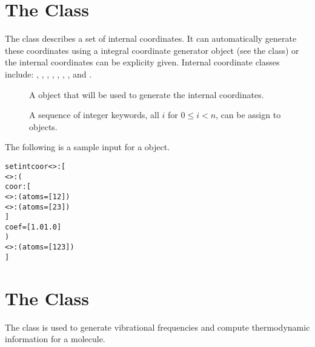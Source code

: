 
\section{The  Class}\label{SetIntCoor}

The  class describes a set of internal coordinates.  It
can automatically generate these coordinates using a integral coordinate
generator object (see the  class) or the internal
coordinates can be explicity given.  Internal coordinate classes include:
, , ,
, ,
, , and
.

\begin{description}
  \item[] A  object that will be
    used to generate the internal coordinates.

  \item[] A sequence of integer keywords, all $i$ for $0 \leq i <
    n$, can be assign to  objects.

\end{description}

The following is a sample  input for
a  object.
\begin{alltt}
  setintcoor<>: [
    <>: (
      coor: [
        <>:( atoms = [ 1 2 ] )
        <>:( atoms = [ 2 3 ] )
        ]
      coef = [ 1.0 1.0 ]
      )
    <>:( atoms = [ 1 2 3 ] )
  ]
\end{alltt}


\section{The  Class}\label{MolecularFrequencies}

The  class is used to generate vibrational
frequencies and compute thermodynamic information for a molecule.

